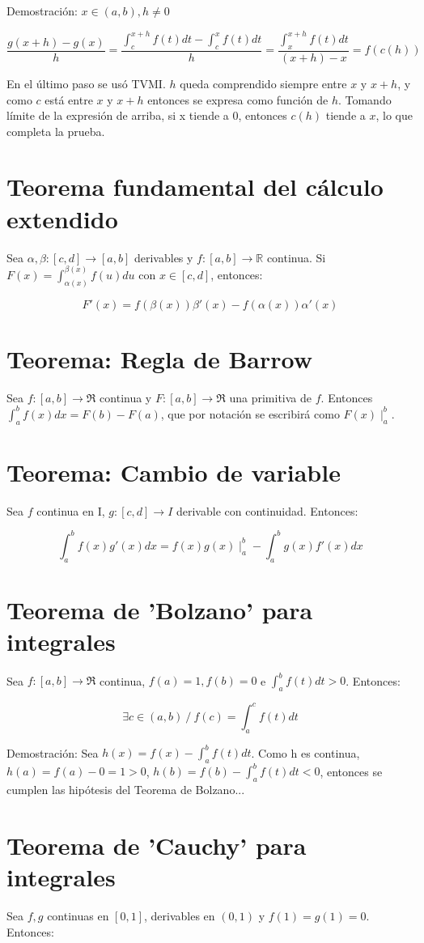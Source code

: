 \documentclass{report}
\begin{document}
		Demostración: $x\in (a,b), h\neq 0$
		
		$$ \frac{g(x+h)-g(x)}{h}=\frac{\int_{c}^{x+h}f(t)dt-\int_{c}^{x}f(t)dt}{h}=\frac{\int_{x}^{x+h}f(t)dt}{(x+h)-x}=f(c(h))$$
		
		En el último paso se usó TVMI. $h$ queda comprendido siempre entre $x$ y $x+h$, y como $c$ está entre $x$ y $x+h$ entonces se expresa como función de $h$.
		Tomando límite de la expresión de arriba, si x tiende a 0, entonces $c(h)$ tiende a $x$, lo que completa la prueba.
		
	\section{Teorema fundamental del cálculo extendido}
		Sea $\alpha, \beta:[c,d] \to [a,b]$ derivables y $f:[a,b]\to \mathbb{R}$ continua.
		Si $F(x)=\int_{\alpha(x)}^{\beta(x)}f(u)du$ con $x \in [c,d]$, entonces:
	
		$$F'(x)=f(\beta(x))\beta'(x)-f(\alpha(x))\alpha'(x)$$
		
	\section{Teorema: Regla de Barrow}
		Sea $f:[a,b] \to \Re$ continua y $F:[a,b]\to \Re$ una primitiva de $f$.
		Entonces $\int_{a}^{b}f(x)dx=F(b)-F(a)$, que por notación se escribirá como $F(x)\mid_{a}^{b}$.
		
	\section{Teorema: Cambio de variable}
		Sea $f$ continua en I, $g:[c,d]\to I$ derivable con continuidad. Entonces:
	
	$$\int_{a}^{b}f(x)g'(x)dx = f(x)g(x)\mid_{a}^{b} - \int_{a}^{b}g(x)f'(x)dx$$
	
	\section{Teorema de 'Bolzano' para integrales}
		Sea $f:[a,b]\to\Re$ continua, $f(a)=1, f(b)=0$ e $\int_{a}^{b}f(t)dt >0$. Entonces:
		
		$$\exists c \in (a,b) \ / \ f(c)=\int_{a}^{c}f(t)dt$$
		
		Demostración: Sea $h(x)=f(x)-\int_{a}^{b}f(t)dt$. Como h es continua, $h(a)=f(a)-0=1>0$, $h(b)=f(b)-\int_{a}^{b}f(t)dt<0$, entonces se cumplen las hipótesis del Teorema de Bolzano...
		
	\section{Teorema de 'Cauchy' para integrales}
		Sea $f, g$ continuas en $[0,1]$, derivables en $(0,1)$ y $f(1)=g(1)=0$. Entonces:
		
\end{document}
